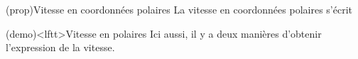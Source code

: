 \documentclass[../../main/main.tex]{subfiles}
\begin{document}
\begin{tcb*}(prop){Vitesse en coordonnées polaires}
	La vitesse en coordonnées polaires s'écrit
	\psw{\[\boxed{\vf(t) = \rp(t)\ur + r(t)\tp(t)\ut}\]}
	\vspace{-15pt}
\end{tcb*}

\begin{tcb*}(demo)<lftt>{Vitesse en polaires}
Ici aussi, il y a deux manières d'obtenir l'expression de la vitesse.
\vspace{-15pt}
  \vspace{-15pt}
  \tcblower
  \psw{%
    \[
      \vf(t) =
      \dv{\OM}{t} =
      \frac{\dd{r}\ur + r(t) \dd{\th}\ut}{\dd{t}} =
      \dv{r}{t} \ur + r(t) \dv{\th}{t}\ut
      \qed
    \]
  }%
  \vspace{-15pt}
\end{tcb*}
\end{document}
